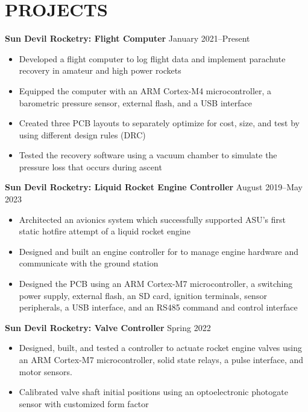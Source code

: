 \documentclass{article}
\begin{document}
\section{PROJECTS}
\textbf{Sun Devil Rocketry: Flight Computer}
\hfill
\vspace{0.5em}
January 2021--Present
\begin{itemize}
\item{Developed a flight computer to log flight data and implement parachute recovery in amateur and high power rockets}
\item{Equipped the computer with an ARM Cortex-M4 microcontroller, a barometric pressure sensor, external flash, and a USB interface}
\item{Created three PCB layouts to separately optimize for cost, size, and test by using different design rules (DRC) }
\item{Tested the recovery software using a vacuum chamber to simulate the pressure loss that occurs during ascent}
\end{itemize}
\vspace{1em}
\textbf{Sun Devil Rocketry: Liquid Rocket Engine Controller}
\hfill
\vspace{0.5em}
August 2019--May 2023
\begin{itemize}
\item{Architected an avionics system which successfully supported ASU's first static hotfire attempt of a liquid rocket engine}
\item{Designed and built an engine controller for to manage engine hardware and communicate with the ground station}
\item{Designed the PCB using an ARM Cortex-M7 microcontroller, a switching power supply, external flash, an SD card, ignition terminals, sensor peripherals, a USB interface, and an RS485 command and control interface}
\end{itemize}
\vspace{1em}
\textbf{Sun Devil Rocketry: Valve Controller}
\hfill
\vspace{0.5em}
Spring 2022
\begin{itemize}
\item{Designed, built, and tested a controller to actuate rocket engine valves using an ARM Cortex-M7 microcontroller, solid state relays, a pulse interface, and motor sensors.}
\item{Calibrated valve shaft initial positions using an optoelectronic photogate sensor with customized form factor}
\end{itemize}
\vspace{0.5em}
\thispagestyle{empty}
\end{document}
